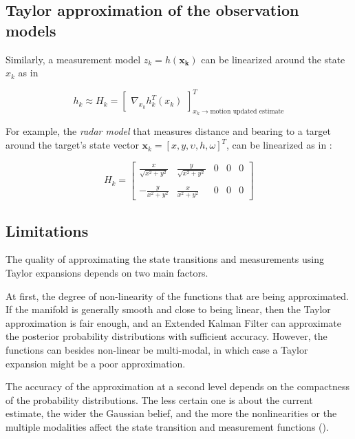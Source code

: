 \subsection{Taylor approximation of the observation models}


Similarly, a measurement model $z_k=h(\mathbf{x_k})$ can be linearized around the state $x_{k}$ as in 


\begin{equation}
\label{eq:linearize_jacobian2}
h_{k} \approx H_{k} =
\begin{bmatrix}
\nabla_{x_{k}} h_{k}^{T}(x_{k})
\end{bmatrix}_{x_{k} \rightarrow\text{motion updated estimate}}^{T}
\end{equation}

For example, the \emph{radar model} that measures distance and bearing  to a target around the target's state vector $\mathbf{x}_k = [x,y,\upsilon,h,\omega]^T$, can be linearized as in :


\begin{equation}
\label{eq:linearize_radar}
H_k =
\begin{bmatrix}
\frac{x}{\sqrt{x^2+y^2}} &\frac{y}{\sqrt{x^2+y^2}} &0 &0 &0 \\\\
-\frac{y}{x^2+y^2} &\frac{x}{x^2+y^2} &0 &0 &0
\end{bmatrix}
\end{equation}

\subsection{Limitations}

The quality of approximating the state transitions and measurements using Taylor expansions depends on two main factors. 


At first, the degree of non-linearity of the functions that are being approximated. If the manifold is generally smooth and close to being linear, then the Taylor approximation is fair enough, and an Extended Kalman Filter can approximate the posterior probability distributions with sufficient accuracy. However, the functions can besides non-linear be multi-modal, in which case a Taylor expansion might be a poor approximation. 


The accuracy of the approximation at a second level depends on the compactness of the probability distributions. The less certain one is about the current estimate, the wider the Gaussian belief, and the more the nonlinearities or the multiple modalities affect the state transition and measurement functions ().


